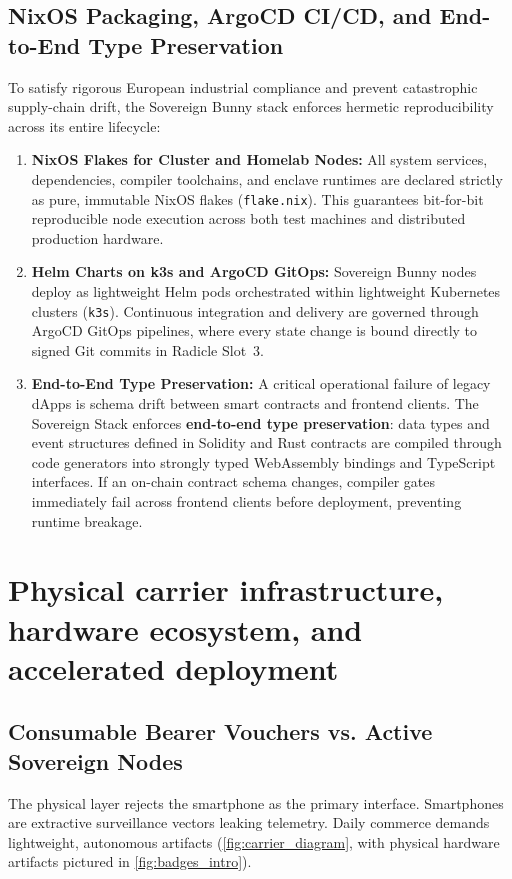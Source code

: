 \documentclass[a4paper,11pt,twoside,parskip=half-,headings=small]{scrartcl}
\newcommand{\code}[1]{\texttt{#1}}
\begin{document}
\subsection{NixOS Packaging, ArgoCD CI/CD, and End-to-End Type Preservation}
\label{sec:nixos_devops}

To satisfy rigorous European industrial compliance and prevent catastrophic supply-chain
drift, the Sovereign Bunny stack enforces hermetic reproducibility across its entire lifecycle:
\begin{enumerate}
  \item \textbf{NixOS Flakes for Cluster and Homelab Nodes:} All system services, dependencies,
compiler toolchains, and enclave runtimes are declared strictly as pure, immutable
NixOS flakes (\code{flake.nix}). This guarantees bit-for-bit reproducible node execution
across both test machines and distributed production hardware.
  \item \textbf{Helm Charts on k3s and ArgoCD GitOps:} Sovereign Bunny nodes deploy as lightweight
Helm pods orchestrated within lightweight Kubernetes clusters (\code{k3s}). Continuous
integration and delivery are governed through ArgoCD GitOps pipelines, where every state
change is bound directly to signed Git commits in Radicle Slot~3.
  \item \textbf{End-to-End Type Preservation:} A critical operational failure of legacy dApps is
schema drift between smart contracts and frontend clients. The Sovereign Stack enforces
\textbf{end-to-end type preservation}: data types and event structures defined in
Solidity and Rust contracts are compiled through code generators into strongly typed
WebAssembly bindings and TypeScript interfaces. If an on-chain contract schema changes,
compiler gates immediately fail across frontend clients before deployment, preventing
runtime breakage.
\end{enumerate}

\section{Physical carrier infrastructure, hardware ecosystem, and accelerated deployment}
\label{sec:terminals}

\subsection{Consumable Bearer Vouchers vs. Active Sovereign Nodes}

The physical layer rejects the smartphone as the primary interface. Smartphones are
extractive surveillance vectors leaking telemetry. Daily commerce demands lightweight,
autonomous artifacts (\cref{fig:carrier_diagram}, with physical hardware artifacts pictured in \cref{fig:badges_intro}).
\end{document}
